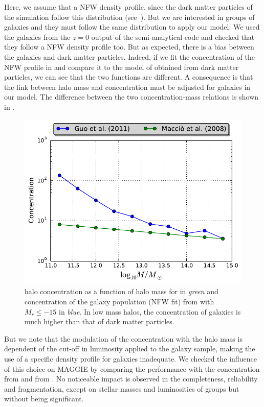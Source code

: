 Here, we assume that a NFW density profile, since the dark matter particles of
the \citet{Borgani+04} simulation follow this distribution (see~\cite{MBM+10}).
But we are interested in groups of galaxies and they must follow the same
distribution to apply our model. We used the galaxies from the $z=0$ output of
the \citet{Guo+11} semi-analytical code and checked that they follow a NFW
density profile too. But as expected, there is a bias between the galaxies and
dark matter particles. Indeed, if we fit the concentration of the NFW profile
in \citet{Guo+11} and compare it to the model of \citet{Maccio+08} obtained
from dark matter particles, we can see that the two functions are different. A
consequence is that the link between halo mass and concentration must be
adjusted for galaxies in our model. The difference between the two
concentration-mass relations is shown in .
%
\begin{figure}[ht]
    \centering
    \includegraphics[width=0.8\linewidth]{figures/maggie/concentrations.pdf}
    \caption{halo concentration as a function of halo mass for
        \citet{Maccio+08} in \emph{green} and concentration of the galaxy
        population (NFW fit) from \citet{Guo+11} with $M_r\leqslant-15$ in
        \emph{blue}. In low mass halos, the concentration of galaxies is much
    higher than that of dark matter particles.\label{fig:concentration_bias}}
\end{figure}
%
But we note that the modulation of the concentration with the halo mass is
dependent of the cut-off in luminosity applied to the galaxy sample, making the
use of a specific density profile for galaxies inadequate. We checked the
influence of this choice on MAGGIE by comparing the performance with the
concentration from \citet{Guo+11} and from \citet{Maccio+08}. No noticeable
impact is observed in the completeness, reliability and fragmentation, except
on stellar masses and luminosities of groups but without being significant.

